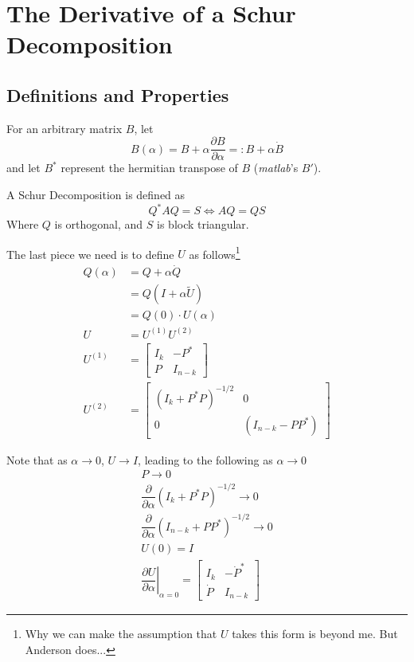 \documentclass[fleqn,12pt]{article}
\begin{document}
\section{The Derivative of a Schur Decomposition}
\subsection{Definitions and Properties}

For an arbitrary matrix $B$, let
\begin{equation}\label{eq:taylor}
  B(\alpha) = B + \alpha \dfrac{\partial B}{\partial \alpha} =: B + \alpha \dot{B}
\end{equation}
and let $B^*$ represent the hermitian transpose of $B$ (\textit{matlab}'s $B'$).

A Schur Decomposition is defined as
\begin{equation}\label{eq:Schur}
  Q^* A Q = S \Leftrightarrow A Q = Q S
\end{equation}
Where $Q$ is orthogonal, and $S$ is block triangular.

The last piece we need is to define $U$ as follows\footnote{
Why we can make the assumption that $U$ takes this form is beyond me.
But Anderson does...
}
\begin{align}
  Q(\alpha) &= Q + \alpha \dot{Q} \\
  &= Q (I + \alpha \tilde{U}) \\
  &= Q(0) \cdot U(\alpha)\\
  U &= U^{(1)} U^{(2)}\\
  U^{(1)} &= \begin{bmatrix}
    I_k & - P^*\\
    P & I_{n-k}
  \end{bmatrix}\\
  U^{(2)} &= \begin{bmatrix}
    (I_{k} + P^* P)^{-1/2} & 0\\
    0 & (I_{n - k} - P P^*)
  \end{bmatrix}
\end{align}

Note that as $\alpha \to 0$, $U \to I$, leading to the following as $\alpha \to 0$
\begin{gather}
  P \to 0\\
  \dfrac{\partial}{\partial \alpha} (I_k + P^* P)^{-1/2} \to 0\\
  \dfrac{\partial}{\partial \alpha} (I_{n-k} + P P^*)^{-1/2} \to 0\\
  U(0) = I\\
  \left. \dfrac{\partial U}{\partial \alpha} \right|_{\alpha = 0} = \begin{bmatrix}
    I_k & - \dot{P}^*\\
    \dot{P} & I_{n-k}
  \end{bmatrix}
\end{gather}
\end{document}
